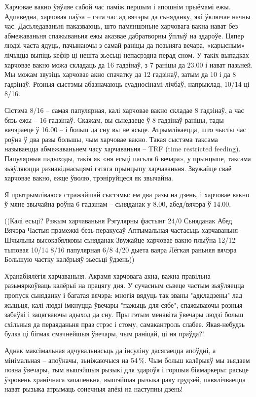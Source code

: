 Харчовае вакно ўяўляе сабой час паміж першым і апошнім прыёмамі ежы. Адпаведна, харчовая паўза – гэта час ад вячэры да сьняданку, які ўключае начны час. Дасьледаваньні паказваюць, што памяншэньне харчовага вакна нават без абмежаваньня спажываньня ежы аказвае дабратворны ўплыў на здароўе. Цяпер людзі часта ядуць, пачынаючы з самай раніцы да позьняга вечара, «карысным» лічыцца выпіць кефір ці нешта зьесьці непасрэдна перад сном. У такіх выпадках харчовае вакно можа складаць да 16 гадзінаў, з 7 раніцы да 23.00 і нават пазьней. Мы можам звузіць харчовае акно спачатку да 12 гадзінаў, затым да 10 і да 8 гадзінаў. Розныя сыстэмы абазначаюць суадносінамі лічбаў, напрыклад, 10/14 ці 8/16.

Сістэма 8/16 – самая папулярная, калі харчовае вакно складае 8 гадзінаў, а час бязь ежы – 16 гадзінаў. Скажам, вы сьнедаеце ў 8 гадзінаў раніцы, тады вячэраеце ў 16.00 -- і больш да сну вы не ясьце. Атрымліваецца, што чысты час роўна ў два разы большы, чым харчовае вакно. Такая сыстэма таксама называецца абмежаваньнем часу харчаваньня – TRF (time restricted feeding). Папулярныя падыходы, такія як «ня есьці пасьля 6 вечара», у прынцыпе, таксама зьяўляюцца разнавіднасьцямі гэтага прынцыпу харчаваньня. Звужайце сваё харчовае вакно, ежце ўволю, трэніруйцеся як звычайна.

Я прытрымліваюся стражэйшай сыстэмы: ем два разы на дзень, і харчовае вакно ў мяне звычайна роўна 6 гадзінам – сьняданак у 8.00, абед/вячэра ў 14.00.

((Калі есьці? Рэжым харчаваньня Рэгулярны фастынг 24/0 Сьняданак Абед Вячэра Частыя прамежкі безь перакусаў Аптымальная частасьць харчаваньня Шчыльны высокабялковы сьняданак Звужайце харчовае вакно плыўна 12/12 тыповая 10/14 8/16 папулярная 6/8 4/20 дыета ваяра Лёгкая раньняя вячэра Большую частку калёрыяў зьесьці ўдзень))

Хранабіялёгія харчаваньня. Акрамя харчовага акна, важна правільна разьмяркоўваць калёрыі на працягу дня. У сучасным сьвеце частым зьяўляецца пропуск сьняданку і багатая вячэра: многія вядуць так званы "адкладзены" лад жыцьця, калі людзі імкнуцца ўвечары "пажыць для сябе", спажываючы розныя забаўкі і зацягваючы адыход да сну. Пры гэтым менавіта ўвечары людзі больш схільныя да пераяданьня праз стрэс і стому, самакантроль слабее. Якая-небудзь булка ці бігмак смачнейшыя ўвечары, чым раніцай, ці ня праўда?!

Аднак максімальная адчувальнасьць да інсуліну дасягаецца апоўдні, а мінімальная – апоўначы, зьніжаючыся на 54\,\%. Чым больш калёрыяў мы зьядаем позна ўвечары, тым вышэйшыя рызыкі для здароўя і горшыя біямаркеры: расьце ўзровень хранічнага запаленьня, вышэйшая рызыка раку грудзей, павялічваецца нават рызыка атрымаць сонечныя апёкі на наступны дзень!

